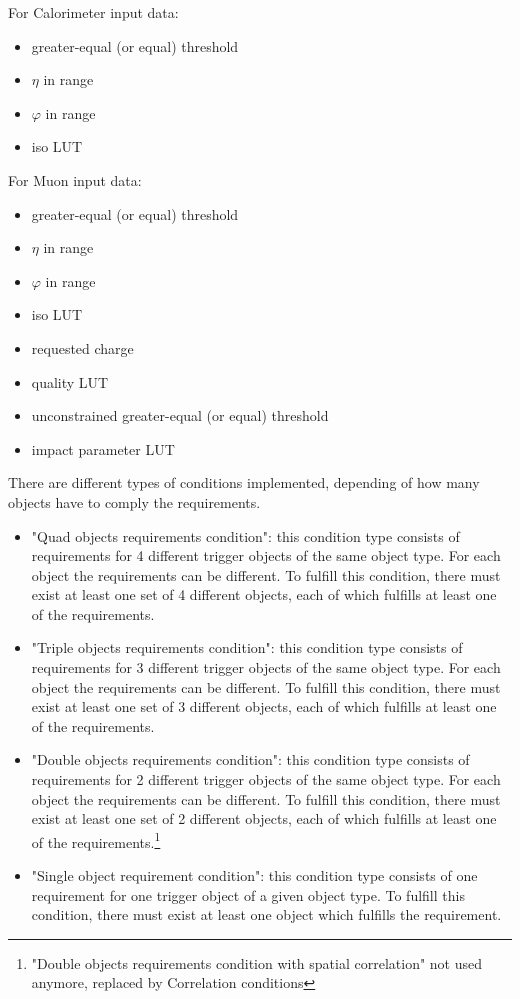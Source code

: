 For Calorimeter input data:
\begin{itemize}
\item \pt greater-equal (or equal) threshold
\item $\eta$ in range
\item $\varphi$ in range
\item iso LUT
\end{itemize}

For Muon input data:
\begin{itemize}
\item \pt greater-equal (or equal) threshold
\item $\eta$ in range
\item $\varphi$ in range
\item iso LUT
\item requested charge
\item quality LUT
\item unconstrained \pt greater-equal (or equal) threshold
\item impact parameter LUT
\end{itemize}

There are different types of conditions implemented, depending of how many objects have to comply the requirements.
\begin{itemize}
\item "Quad objects requirements condition": this condition type consists of requirements for 4 different trigger objects of the same object type.
For each object the requirements can be different. To fulfill this condition, there must exist at least one set of 4 different objects,
each of which fulfills at least one of the requirements.
\item "Triple objects requirements condition": this condition type consists of requirements for 3 different trigger objects of the same object type.
For each object the requirements can be different. To fulfill this condition, there must exist at least one set of 3 different objects,
each of which fulfills at least one of the requirements.
\item "Double objects requirements condition": this condition type consists of requirements for 2 different trigger objects of the same object type.
For each object the requirements can be different. To fulfill this condition, there must exist at least one set of 2 different objects,
each of which fulfills at least one of the requirements.\footnote{"Double objects requirements condition with spatial correlation" not used anymore, replaced by Correlation conditions}
\item "Single object requirement condition": this condition type consists of one requirement for one trigger object of a given object type.
To fulfill this condition, there must exist at least one object which fulfills the requirement.
\end{itemize}

